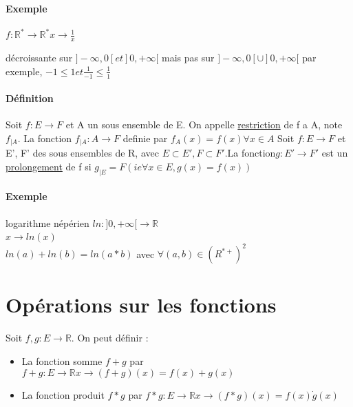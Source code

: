 \paragraph{Exemple} $f: \mathbb{R}^* \rightarrow \mathbb{R}^*
x \rightarrow \frac{1}{x}$


décroissante sur $]-\infty, 0[ et ]0, +\infty[$ mais pas sur $]-\infty, 0[ \cup ]0, +\infty[$
par exemple, $-1 \leq 1 et \frac{1}{-1} \leq \frac{1}{1}$

\paragraph{Définition} Soit $f:E \rightarrow F$ et A un sous ensemble de E.
On appelle \ul{restriction} de f a A, note $f_{|A}$. La fonction $f_{|A} : A \rightarrow F$ definie par $f_{A}(x) = f(x) \forall x \in A$
Soit $f:E \rightarrow F$ et E', F' des sous ensembles de R, avec $E \subset E',F \subset F' . $La fonction$ g : E' \rightarrow F'$ est un \ul{prolongement} de f si $g_{|E} = F (ie \forall x \in E, g(x) = f(x))$

\paragraph{Exemple} logarithme népérien $ln : ]0, +\infty[ \rightarrow \mathbb{R}$
	~\\
	$x \rightarrow ln(x)$
	~\\
	$ln(a) + ln(b) = ln(a*b)$ avec $\forall (a, b) \in (R^{*+})^2$


\section{Opérations sur les fonctions}
Soit $f, g : E \rightarrow \mathbb{R}$. On peut définir :

\begin{itemize}
	\item La fonction somme $f+g$ par $f+g : E \rightarrow \mathbb{R}
		x\rightarrow(f+g)(x) = f(x)+g(x)$
	\item La fonction produit $f*g$ par $f*g : E \rightarrow \mathbb{R}
		x\rightarrow(f*g)(x) = f(x) \dot g(x)$
\end{itemize}

